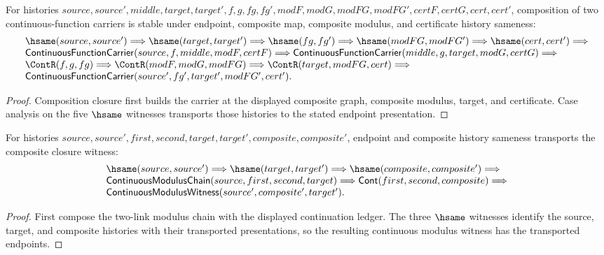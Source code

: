 \begin{theorem}
\label{thm:continuous-function-carrier-comp-endpoint-hsame-transport}
For histories $source,source',middle,target,target',f,g,fg,fg',modF,modG,
modFG,modFG',certF,certG,cert,cert'$, composition of two continuous-function
carriers is stable under endpoint, composite map, composite modulus, and
certificate history sameness:
$$
\begin{array}{l}
\hsame(source,source')\Longrightarrow
\hsame(target,target')\Longrightarrow
\hsame(fg,fg')\Longrightarrow
\hsame(modFG,modFG')\Longrightarrow
\hsame(cert,cert')\Longrightarrow
\\
\mathsf{ContinuousFunctionCarrier}(source,f,middle,modF,certF)\Longrightarrow
\mathsf{ContinuousFunctionCarrier}(middle,g,target,modG,certG)\Longrightarrow
\\
\ContR(f,g,fg)\Longrightarrow
\ContR(modF,modG,modFG)\Longrightarrow
\ContR(target,modFG,cert)\Longrightarrow
\\
\mathsf{ContinuousFunctionCarrier}(source',fg',target',modFG',cert').
\end{array}
$$
\end{theorem}
\begin{proof}
Composition closure first builds the carrier at the displayed composite graph,
composite modulus, target, and certificate. Case analysis on the five
$\hsame$ witnesses transports those histories to the stated endpoint
presentation.
\end{proof}

\begin{theorem}
\label{thm:continuous-modulus-chain-composite-endpoint-hsame-transport}
For histories $source,source',first,second,target,target',composite,composite'$,
endpoint and composite history sameness transports the composite closure
witness:
$$
\begin{array}{l}
\hsame(source,source')\Longrightarrow
\hsame(target,target')\Longrightarrow
\hsame(composite,composite')\Longrightarrow
\\
\mathsf{ContinuousModulusChain}(source,first,second,target)\Longrightarrow
\mathsf{Cont}(first,second,composite)\Longrightarrow
\\
\mathsf{ContinuousModulusWitness}(source',composite',target').
\end{array}
$$
\end{theorem}
\begin{proof}
First compose the two-link modulus chain with the displayed continuation
ledger. The three $\hsame$ witnesses identify the source, target, and composite
histories with their transported presentations, so the resulting continuous
modulus witness has the transported endpoints.
\end{proof}

